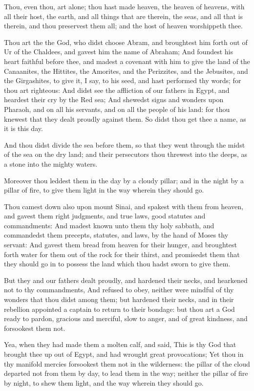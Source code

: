 \verse Thou, even thou, art \LORD alone; thou hast made heaven, the heaven of heavens, with all their host, the earth, and all things that are therein, the seas, and all that is therein, and thou preservest them all; and the host of heaven worshippeth thee.

\verse Thou art the \LORD the God, who didst choose Abram, and broughtest him forth out of Ur of the Chaldees, and gavest him the name of Abraham; \verse And foundest his heart faithful before thee, and madest a covenant with him to give the land of the Canaanites, the Hittites, the Amorites, and the Perizzites, and the Jebusites, and the Girgashites, to give it, I say, to his seed, and hast performed thy words; for thou art righteous: \verse And didst see the affliction of our fathers in Egypt, and heardest their cry by the Red sea; \verse And shewedst signs and wonders upon Pharaoh, and on all his servants, and on all the people of his land: for thou knewest that they dealt proudly against them. So didst thou get thee a name, as it is this day.

\verse And thou didst divide the sea before them, so that they went through the midst of the sea on the dry land; and their persecutors thou threwest into the deeps, as a stone into the mighty waters.

\verse Moreover thou leddest them in the day by a cloudy pillar; and in the night by a pillar of fire, to give them light in the way wherein they should go.

\verse Thou camest down also upon mount Sinai, and spakest with them from heaven, and gavest them right judgments, and true laws, good statutes and commandments: \verse And madest known unto them thy holy sabbath, and commandedst them precepts, statutes, and laws, by the hand of Moses thy servant: \verse And gavest them bread from heaven for their hunger, and broughtest forth water for them out of the rock for their thirst, and promisedst them that they should go in to possess the land which thou hadst sworn to give them.

\verse But they and our fathers dealt proudly, and hardened their necks, and hearkened not to thy commandments, \verse And refused to obey, neither were mindful of thy wonders that thou didst among them; but hardened their necks, and in their rebellion appointed a captain to return to their bondage: but thou art a God ready to pardon, gracious and merciful, slow to anger, and of great kindness, and forsookest them not.

\verse Yea, when they had made them a molten calf, and said, This is thy God that brought thee up out of Egypt, and had wrought great provocations; \verse Yet thou in thy manifold mercies forsookest them not in the wilderness: the pillar of the cloud departed not from them by day, to lead them in the way; neither the pillar of fire by night, to shew them light, and the way wherein they should go.

